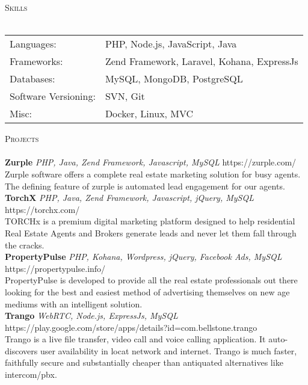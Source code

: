 \documentclass[a4paper]{article}
\newcommand{\lineunder} {
    \vspace*{-8pt} \\
    \hspace*{-18pt} \hrulefill \\
}
\newcommand{\header} [1] {
    {\hspace*{-18pt}\vspace*{6pt} \textsc{#1}}
    \vspace*{-6pt} \lineunder
}
\begin{document}
\header{Skills}
\begin{tabular}{ l l }
	Languages:           & PHP, Node.js, JavaScript, Java             \\
	Frameworks:          & Zend Framework, Laravel, Kohana, ExpressJs \\
	Databases:           & MySQL, MongoDB, PostgreSQL                 \\
	Software Versioning: & SVN, Git                                   \\
	Misc:                & Docker, Linux, MVC                         \\
\end{tabular}
\vspace{2mm}

\header{Projects}
{\textbf{Zurple}} {\sl PHP, Java, Zend Framework, Javascript, MySQL} \hfill https://zurple.com/\\
Zurple software offers a complete real estate marketing solution for busy agents. The defining feature of zurple is automated lead engagement for our agents.\\
\vspace*{2mm}
{\textbf{TorchX}} {\sl PHP, Java, Zend Framework, Javascript, jQuery, MySQL} \hfill https://torchx.com/\\
TORCHx is a premium digital marketing platform designed to help residential Real Estate Agents and Brokers generate leads and never let them fall through the cracks.\\
\vspace*{2mm}
{\textbf{PropertyPulse}} {\sl PHP, Kohana, Wordpress, jQuery, Facebook Ads, MySQL} \hfill https://propertypulse.info/\\
PropertyPulse is developed to provide all the real estate professionals out there looking for the best and easiest method of advertising themselves on new age mediums with an intelligent solution.\\
\vspace*{2mm}
{\textbf{Trango}} {\sl WebRTC, Node.js, ExpressJs, MySQL} \hfill https://play.google.com/store/apps/details?id=com.bellstone.trango\\
Trango is a live file transfer, video call and voice calling application. It auto-discovers user availability in locat network and internet. Trango is much faster, faithfully secure and substantially cheaper than antiquated alternatives like intercom/pbx.\\
\vspace*{2mm}



\ 
\end{document}
